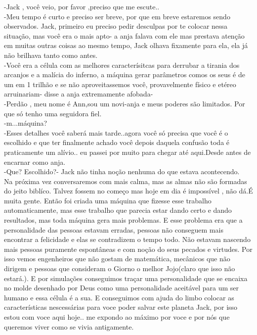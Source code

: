 \documentclass{book}
\begin{document}
-Jack , você veio, por favor ,preciso que me escute..\\

-Meu tempo é curto e preciso ser breve, por que em breve estaremos sendo observados. Jack, primeiro eu preciso pedir desculpas por te colocar nessa situação, mas você era o mais apto- a anja falava com ele mas prestava atenção em muitas outras coisas ao mesmo tempo, Jack olhava fixamente para ela, ela já não brilhava tanto como antes.\\

-Você era a célula com as melhores caracterísitcas para derrubar a tirania dos arcanjos e a malícia do inferno, a máquina gerar parâmetros comos os seus é de um em 1 trilhão e se não aproveitassemos você, provavelmente físico e etéreo arruinariam- disse a anja extremamente afobada-\\
-Perdão , meu nome é Ann,sou um novi-anja e meus poderes são limitados. Por que só tenho uma seguidora fiel. \\
-m...máquina?\\
-Esses detalhes você saberá mais tarde..agora você só precisa que você é o escolhido e que ter finalmente achado você depois daquela confusão toda é praticamente um alívio.. eu passei por muito para chegar até aqui.Desde antes de encarnar como anja.\\
-Que? Escolhido?- Jack não tinha noção nenhuma do que estava acontecendo.\\
Na próxima vez conversaremos com mais calma, mas as almas não são formadas do jeito biblíco. Talvez fossem no começo mas hoje em dia é impossível , não dá.É muita gente. Então foi criada uma máquina que fizesse esse trabalho automaticamente, mas esse trabalho que parecia estar dando certo e dando resultados, mas toda máquina gera mais problemas. E esse problema era que a personalidade das pessoas estavam erradas, pessoas não conseguem mais encontrar a felicidade e elas se contradizem o tempo todo. Não estavam nascendo mais pessoas puramente espontâneas e com noção do seus pecados e virtudes. Por isso vemos engenheiros que não gostam de matemática, mecânicos que não dirigem e pessoas que consideram o Giorno o melhor Jojo(claro que isso não estará.). E por simulações conseguimos traçar uma personalidade que se encaixa no molde desenhado por Deus como uma personalidade aceitável para um ser humano e essa célula é a sua. E conseguimos com ajuda do limbo colocar as características nescessárias para voce poder salvar este planeta Jack, por isso estou com voce aqui hoje.. me expondo ao máximo por voce e por nós que queremos viver como se vivia antigamente. \\
\end{document}
